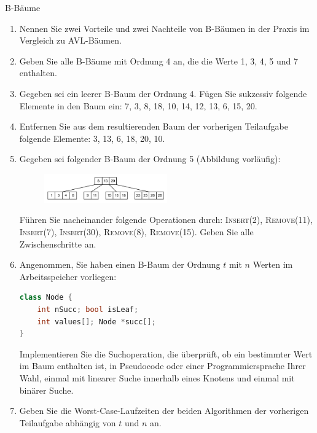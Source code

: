 \documentclass[11pt,a4paper]{article}
\begin{document}
\begin{aufgabe}{3}{B-Bäume}
    \begin{enumerate}
        \item
        Nennen Sie zwei Vorteile und zwei Nachteile von B-Bäumen in der Praxis im Vergleich zu AVL-Bäumen.

        \item Geben Sie alle B-Bäume mit Ordnung 4 an, die die Werte 1, 3, 4, 5 und 7 enthalten.

        \item Gegeben sei ein leerer B-Baum der Ordnung 4. Fügen Sie sukzessiv folgende Elemente in den Baum ein: 
        7, 3, 8, 18, 10, 14, 12, 13, 6, 15, 20.

        \item
        Entfernen Sie aus dem resultierenden Baum der vorherigen Teilaufgabe folgende Elemente:
        3, 13, 6, 18, 20, 10.

        \item
        Gegeben sei folgender B-Baum der Ordnung 5 (Abbildung vorläufig):
        \begin{figure}[h!]
            \centering
            \includegraphics[width=0.5\textwidth]{img/3d}
        \end{figure}
        \FloatBarrier
        Führen Sie nacheinander folgende Operationen durch: 
        \textsc{Insert(2)}, \textsc{Remove(11)}, \textsc{Insert(7)}, \textsc{Insert(30)}, \textsc{Remove(8)}, \textsc{Remove(15)}.
        Geben Sie alle Zwischenschritte an.
        
        \item Angenommen, Sie haben einen B-Baum der Ordnung $t$ mit $n$ Werten im Arbeitsspeicher vorliegen:
        \begin{lstlisting}[language=c++]
class Node {
    int nSucc; bool isLeaf;
    int values[]; Node *succ[];
}
        \end{lstlisting}
        Implementieren Sie die Suchoperation, die überprüft, ob ein bestimmter Wert im Baum enthalten ist, in Pseudocode oder einer Programmiersprache Ihrer Wahl, einmal mit linearer Suche innerhalb eines Knotens und einmal mit binärer Suche.

        \item Geben Sie die Worst-Case-Laufzeiten der beiden Algorithmen der vorherigen Teilaufgabe abhängig von $t$ und $n$ an.
    \end{enumerate}
\end{aufgabe}
\end{document}
